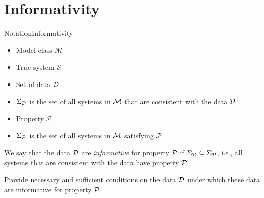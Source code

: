 \documentclass[aspectratio=169, handout, 10pt, hyperref=colorlinks]{beamer}
\begin{document}
\section{Informativity}
\begin{frame}[allowframebreaks]{Notation}{Informativity}
    \begin{itemize}
        \item Model class $\mathcal{M}$
        \item True system $\mathcal{S}$
        \item Set of data $\mathcal{D}$
        \item $\Sigma_{\mathcal{D}}$ is the set of all systems in $\mathcal{M}$ that are consistent with the data $\mathcal{D}$
        \item Property $\mathcal{P}$
        \item $\Sigma_{\mathcal{P}}$ is the set of all systems in $\mathcal{M}$ satisfying $\mathcal{P}$
    \end{itemize}
    \begin{definition}\label{ch1:def:informativity}
        We say that the data $\mathcal{D}$ are \textit{informative} for property $\mathcal{P}$ if $\Sigma_{\mathcal{D}} \subseteq\Sigma_{\mathcal{P}}$, i.e., all systems that are consistent with the data have property $\mathcal{P}$. 
    \end{definition}
    \begin{problem}\label{ch3:prob:general}
    Provide necessary and sufficient conditions on the data $\mathcal{D}$ under which these data are informative for property $\mathcal{P}$. 
    \end{problem}
    \begin{figure}[H]
        \centering
\end{figure}
\end{frame}
\end{document}
